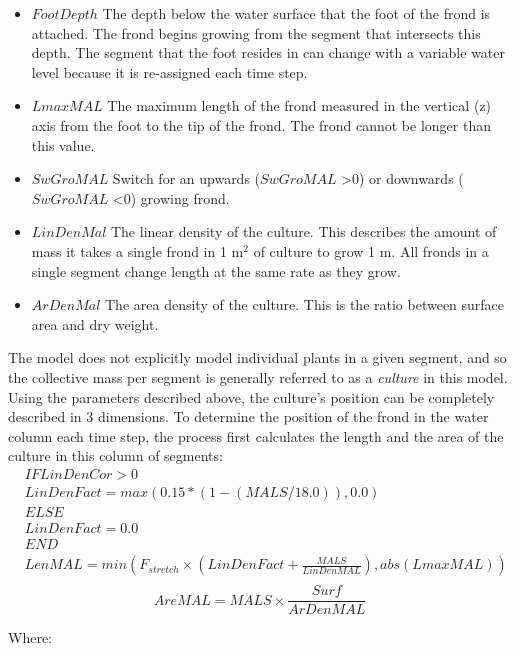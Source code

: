 \documentclass{deltares_manual}
\begin{document}
\begin{itemize}
\item $FootDepth$ The depth below the water surface that the foot of the frond is attached. The frond begins growing from the segment that intersects this depth. The segment that the foot resides in can change with a variable water level because it is re-assigned each time step.
\item $LmaxMAL$ The maximum length of the frond measured in the vertical (z) axis from the foot to the tip of the frond. The frond cannot be longer than this value.
\item $SwGroMAL$ Switch for an upwards ($SwGroMAL$ \textgreater 0) or downwards ($SwGroMAL$ \textless 0) growing frond.
\item $LinDenMal$ The linear density of the culture. This describes the amount of mass it takes a single frond in 1 m$^{2}$ of culture to grow 1 m. All fronds in a single segment change length at the same rate as they grow.
\item $ArDenMal$ The area density of the culture. This is the ratio between surface area and dry weight.
\end{itemize}

The model does not explicitly model individual plants in a given segment, and so the collective mass per segment is generally referred to as a \textit{culture} in this model. Using the parameters described above, the culture's position can be completely described in 3 dimensions. To determine the position of the frond in the water column each time step, the process first calculates the length and the area of the culture in this column of segments:
\begin{equation}
\begin{aligned}
	&IF LinDenCor > 0\\
	&	LinDenFact = max(0.15 * (1 - (MALS/18.0)), 0.0)\\
	&ELSE\\
	&	LinDenFact = 0.0\\
	&END\\
	&LenMAL = min(F_{stretch} \times(LinDenFact + \frac{MALS}{LinDenMAL}), abs(LmaxMAL))\\
\end{aligned}
\end{equation}
\begin{equation}
	AreMAL = MALS \times \frac{Surf}{ArDenMAL}
\end{equation}


Where:\\
\end{document}
